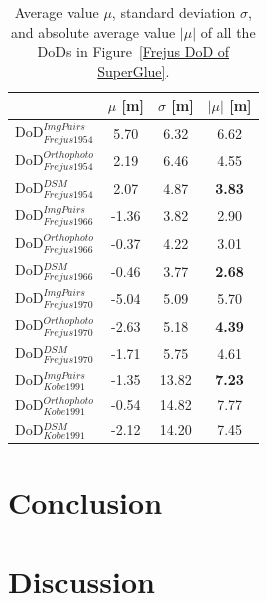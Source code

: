 \begin{table}%
    \footnotesize
    \centering
    \begin{tabular}{||l|c|c|c||}\hline
        &$\mu$ [m]&$\sigma$ [m]&$|\mu|$ [m]\\\hline\hline
        DoD$_{Frejus1954}^{ImgPairs}$ & 5.70 & 6.32 & 6.62\\
        DoD$_{Frejus1954}^{Orthophoto}$ & 2.19 & 6.46 & 4.55\\
        DoD$_{Frejus1954}^{DSM}$ & 2.07 & 4.87 & \textbf{3.83}\\\hline
        DoD$_{Frejus1966}^{ImgPairs}$ & -1.36 & 3.82 & 2.90\\
        DoD$_{Frejus1966}^{Orthophoto}$ & -0.37 & 4.22 & 3.01\\
        DoD$_{Frejus1966}^{DSM}$ & -0.46 & 3.77 & \textbf{2.68}\\\hline
        DoD$_{Frejus1970}^{ImgPairs}$ & -5.04 & 5.09 & 5.70\\
        DoD$_{Frejus1970}^{Orthophoto}$ & -2.63 & 5.18 & \textbf{4.39}\\
        DoD$_{Frejus1970}^{DSM}$ & -1.71 & 5.75 & 4.61\\\hline
        DoD$_{Kobe1991}^{ImgPairs}$ &-1.35 & 13.82 & \textbf{7.23}\\
        DoD$_{Kobe1991}^{Orthophoto}$ &-0.54 & 14.82 & 7.77\\
        DoD$_{Kobe1991}^{DSM}$ &-2.12 & 14.20 & 7.45\\\hline
    \end{tabular}
    \caption{Average value $\mu$, standard deviation $\sigma$, and absolute average value $|\mu|$ of all the DoDs in Figure~\ref{Frejus DoD of SuperGlue}.}
    \label{CheckptAcuracy}
\end{table}




\section{Conclusion}

\section{Discussion}

